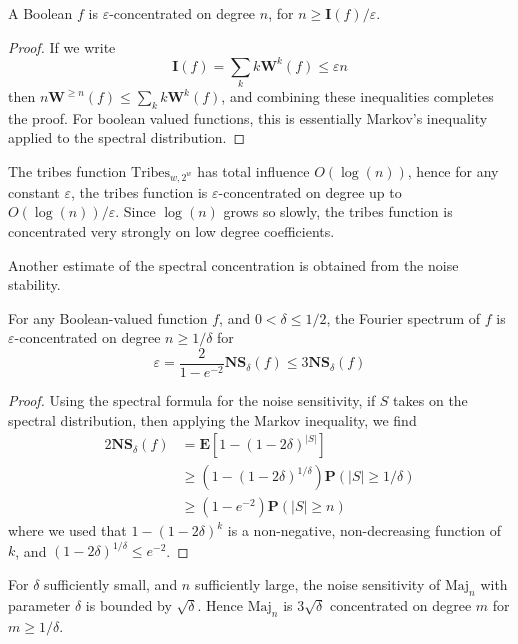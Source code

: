 \begin{theorem}
    A Boolean $f$ is $\varepsilon$-concentrated on degree $n$, for $n \geq \mathbf{I}(f)/\varepsilon$.
\end{theorem}
\begin{proof}
    If we write
    \[ \mathbf{I}(f) = \sum_k k \mathbf{W}^k(f) \leq \varepsilon n \]
    then $n \mathbf{W}^{\geq n}(f) \leq \sum_k k \mathbf{W}^k(f)$, and combining these inequalities completes the proof. For boolean valued functions, this is essentially Markov's inequality applied to the spectral distribution.
\end{proof}

\begin{example}
    The tribes function $\text{Tribes}_{w,2^w}$ has total influence $O(\log(n))$, hence for any constant $\varepsilon$, the tribes function is $\varepsilon$-concentrated on degree up to $O(\log(n))/\varepsilon$. Since $\log(n)$ grows so slowly, the tribes function is concentrated very strongly on low degree coefficients.
\end{example}

Another estimate of the spectral concentration is obtained from the noise stability.

\begin{theorem}
    For any Boolean-valued function $f$, and $0 < \delta \leq 1/2$, the Fourier spectrum of $f$ is $\varepsilon$-concentrated on degree $n \geq 1/\delta$ for
    \[ \varepsilon = \frac{2}{1 - e^{-2}} \mathbf{NS}_\delta(f) \leq 3 \mathbf{NS}_\delta(f) \]
\end{theorem}
\begin{proof}
    Using the spectral formula for the noise sensitivity, if $S$ takes on the spectral distribution, then applying the Markov inequality, we find
    \begin{align*}
        2 \mathbf{NS}_\delta(f) &= \mathbf{E}[1 - (1 - 2\delta)^{|S|}]\\
        &\geq (1 - (1 - 2\delta)^{1/\delta}) \mathbf{P}(|S| \geq 1/\delta)\\
        &\geq (1 - e^{-2}) \mathbf{P}(|S| \geq n)
    \end{align*}
    where we used that $1 - (1 - 2\delta)^k$ is a non-negative, non-decreasing function of $k$, and $(1 - 2\delta)^{1/\delta} \leq e^{-2}$.
\end{proof}

\begin{example}
    For $\delta$ sufficiently small, and $n$ sufficiently large, the noise sensitivity of $\text{Maj}_n$ with parameter $\delta$ is bounded by $\sqrt{\delta}$. Hence $\text{Maj}_n$ is $3\sqrt{\delta}$ concentrated on degree $m$ for $m \geq 1/\delta$.
\end{example}

